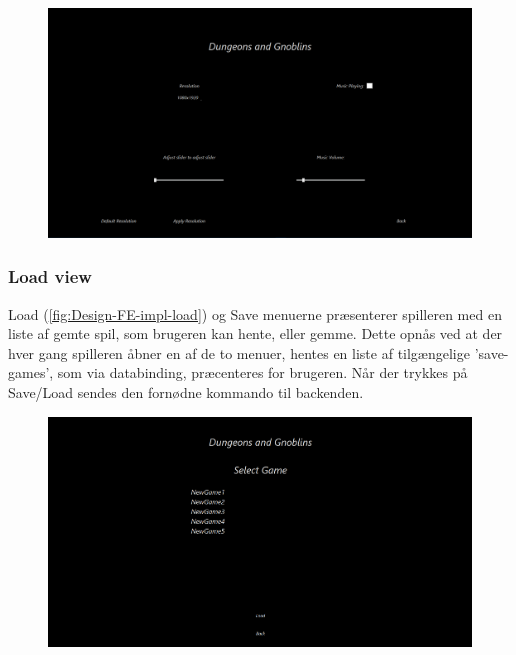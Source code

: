 \begin{figure}[h]
\centering
\includegraphics[width = \textwidth]{02-Body/Images/SettingsMenu_final.PNG}
\caption{}
\label{fig:Design-FE-impl-settings}
\end{figure}

\subsubsection{Load view}

Load (\autoref{fig:Design-FE-impl-load}) og Save menuerne præsenterer spilleren med en liste af gemte spil, som brugeren kan hente, eller gemme. Dette opnås ved at der hver gang spilleren åbner en af de to menuer, hentes en liste af tilgængelige 'save-games', som via databinding, præcenteres for brugeren. Når der trykkes på Save/Load sendes den fornødne kommando til backenden.

\begin{figure}[h]
\centering
\includegraphics[width = \textwidth]{02-Body/Images/LoadMenu_final.png}
\caption{}
\label{fig:Design-FE-impl-load}
\end{figure}

